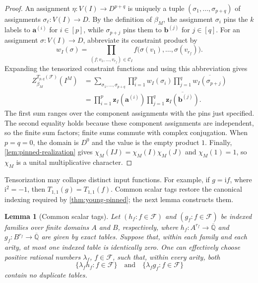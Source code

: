 \documentclass[11pt]{article}
\theoremstyle{plain}
\newtheorem{lemma}[lemma]{Lemma}
\theoremstyle{definition}
\theoremstyle{remark}
\newcommand{\AlgNums}{\overline{\mathbb Q}}
\newcommand{\cF}{\mathcal F}
\newcommand{\zvec}[1]{\mathbf z_{#1}}
\begin{document}
\begin{proof}
An assignment $\eta:V(I)\to D^{p+q}$ is uniquely a tuple
$(\sigma_1,\ldots,\sigma_{p+q})$ of assignments
$\sigma_\ell:V(I)\to D$.  By the definition of $\beta_M$, the assignment
$\sigma_i$ pins the $k$ labels to $\mathbf a^{(i)}$ for $i\in[p]$, while
$\sigma_{p+j}$ pins them to $\mathbf b^{(j)}$ for $j\in[q]$.
For an assignment $\sigma:V(I)\to D$, abbreviate its constraint product by
\[
  w_I(\sigma)
  =\prod_{(f;v_1,\ldots,v_{r_f})\in\mathcal C_I}
     f\bigl(\sigma(v_1),\ldots,\sigma(v_{r_f})\bigr).
\]
Expanding the tensorized constraint functions and using this abbreviation
gives
\begin{align*}
  Z_{\beta_M}^{T_{p,q}(\cF)}(I^M)
  &=\sum_{\sigma_1,\ldots,\sigma_{p+q}}
      \prod_{i=1}^p w_I(\sigma_i)
      \prod_{j=1}^q\overline{w_I(\sigma_{p+j})}\\
  &=\prod_{i=1}^{p}\zvec I(\mathbf a^{(i)})
    \prod_{j=1}^{q}\overline{\zvec I(\mathbf b^{(j)})}.
\end{align*}
The first sum ranges over the component assignments with the pins just
specified.  The second equality holds because these component assignments
are independent, so the finite sum factors; finite sums commute with complex
conjugation.  When $p=q=0$, the domain is $D^0$ and the value is the empty
product $1$.  Finally, \cref{lem:pinned-realization} gives
$\chi_M(IJ)=\chi_M(I)\chi_M(J)$ and $\chi_M(1)=1$, so $\chi_M$ is a unital
multiplicative character.
\end{proof}

Tensorization may collapse distinct input functions.  For example, if
$g=\mathrm{i}f$, where $\mathrm{i}^2=-1$, then
$T_{1,1}(g)=T_{1,1}(f)$.  Common scalar tags restore the canonical indexing
required by \cref{thm:young-pinned}; the next lemma constructs them.

\begin{lemma}[Common scalar tags]
\label{lem:scalar-tags}
Let $(h_f:f\in\cF)$ and $(g_f:f\in\cF)$ be indexed families over finite
domains $A$ and $B$, respectively, where
$h_f:A^{r_f}\to\AlgNums$ and $g_f:B^{r_f}\to\AlgNums$ are given by exact
tables.  Suppose that, within
each family and each arity, at most one indexed table is identically zero.
One can effectively choose positive rational numbers $\lambda_f$, $f\in\cF$,
such that, within every arity, both
\[
  \{\lambda_f h_f:f\in\cF\}
  \quad\text{and}\quad
  \{\lambda_f g_f:f\in\cF\}
\]
contain no duplicate tables.
\end{lemma}
\end{document}
